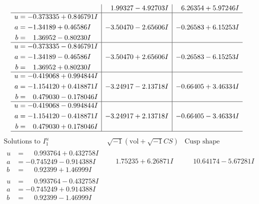 \documentclass[1p]{elsarticle_modified}
\theoremstyle{definition}
\newcommand{\I}{\sqrt{-1}}
\begin{document}
$$\begin{array}{c|c|c}
 & \phantom{-}1.99327 - 4.92703 I & \phantom{-}6.26354 + 5.97246 I \\ \hline\begin{aligned}
u &= -0.373335 + 0.846791 I \\
a &= -1.34189 + 0.46586 I \\
b &= \phantom{-}1.36952 - 0.80230 I\end{aligned}
 & -3.50470 - 2.65606 I & -0.26583 + 6.15253 I \\ \hline\begin{aligned}
u &= -0.373335 - 0.846791 I \\
a &= -1.34189 - 0.46586 I \\
b &= \phantom{-}1.36952 + 0.80230 I\end{aligned}
 & -3.50470 + 2.65606 I & -0.26583 - 6.15253 I \\ \hline\begin{aligned}
u &= -0.419068 + 0.994844 I \\
a &= -1.154120 + 0.418871 I \\
b &= \phantom{-}0.479030 - 0.178046 I\end{aligned}
 & -3.24917 - 2.13718 I & -0.66405 + 3.46334 I \\ \hline\begin{aligned}
u &= -0.419068 - 0.994844 I \\
a &= -1.154120 - 0.418871 I \\
b &= \phantom{-}0.479030 + 0.178046 I\end{aligned}
 & -3.24917 + 2.13718 I & -0.66405 - 3.46334 I\\
 \hline 
 \end{array}$$\newpage$$\begin{array}{c|c|c}  
\text{Solutions to }I^u_{1}& \I (\text{vol} + \sqrt{-1}CS) & \text{Cusp shape}\\
 \hline 
\begin{aligned}
u &= \phantom{-}0.993764 + 0.432758 I \\
a &= -0.745249 - 0.914388 I \\
b &= \phantom{-}0.92399 + 1.46999 I\end{aligned}
 & \phantom{-}1.75235 + 6.26871 I & \phantom{-}10.64174 - 5.67281 I \\ \hline\begin{aligned}
u &= \phantom{-}0.993764 - 0.432758 I \\
a &= -0.745249 + 0.914388 I \\
b &= \phantom{-}0.92399 - 1.46999 I\end{aligned}

\end{array}$$
\end{document}
